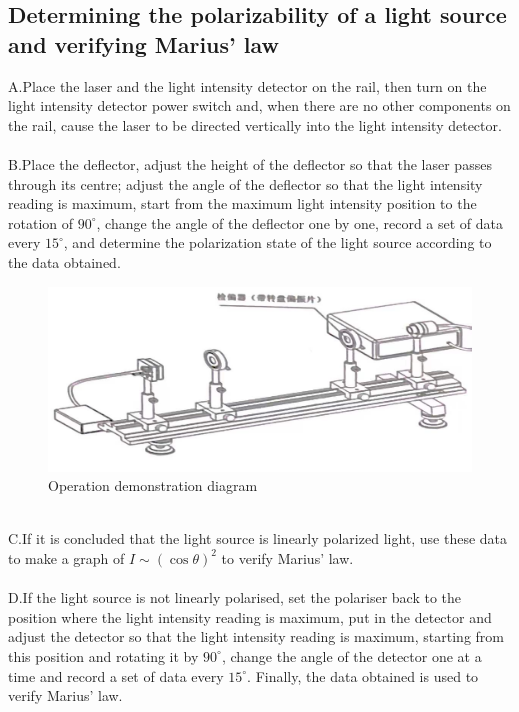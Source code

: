 \documentclass[UTF8]{article}
\begin{document}
	\subsection{Determining the polarizability of a light source and verifying Marius' law}
    A.Place the laser and the light intensity detector on the rail, then turn on the light intensity detector power switch and, when there are no other components on the rail, cause the laser to be directed vertically into the light intensity detector.
    \\
    \\B.Place the deflector, adjust the height of the deflector so that the laser passes through its centre; adjust the angle of the deflector so that the light intensity reading is maximum, start from the maximum light intensity position to the rotation of $90^\circ$, change the angle of the deflector one by one, record a set of data every $15^\circ$, and determine the polarization state of the light source according to the data obtained.
     \begin{figure}[h]
    	\centering
    	\includegraphics[clip,scale=0.2,trim={0 0 0 0}]{figure/fig9.jpg}
    	\caption{Operation demonstration diagram}
    	\label{figure.8}
    \end{figure}
   \\C.If it is concluded that the light source is linearly polarized light, use these data to make a graph of $I\sim \left ( \cos \theta  \right ) ^{2} $ to verify Marius' law.
    \\
    \\D.If the light source is not linearly polarised, set the polariser back to the position where the light intensity reading is maximum, put in the detector and adjust the detector so that the light intensity reading is maximum, starting from this position and rotating it by $90^\circ$, change the angle of the detector one at a time and record a set of data every $15^\circ$. Finally, the data obtained is used to verify Marius' law.
	
\end{document}
